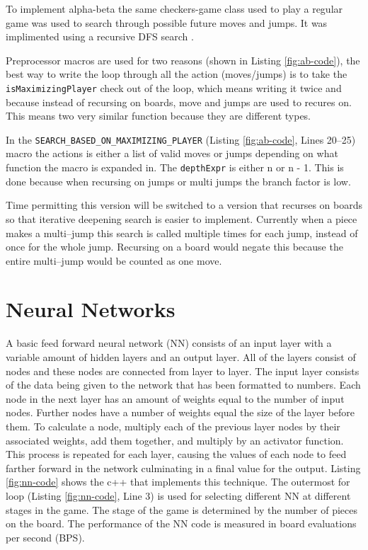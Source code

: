 \documentclass{article}
\begin{document}
To implement alpha-beta the same checkers-game class used to play a regular
game was used to search through possible future moves and jumps. It was implimented
using a recursive DFS search .


Preprocessor macros are used for two reasons (shown in Listing \ref{fig:ab-code}), the best way to write the loop
through all the action (moves/jumps) is to take the \texttt{isMaximizingPlayer} check
out of the loop, which means writing it twice and because instead of recursing
on boards, move and jumps are used to recures on. This means two very similar
function because they are different types.

In the \texttt{SEARCH\_BASED\_ON\_MAXIMIZING\_PLAYER} (Listing \ref{fig:ab-code}, Lines 20--25)
macro the actions is either a list of valid
moves or jumps depending on what function the macro is expanded in. The
\texttt{depthExpr} is either n or n - 1. This is done because when recursing on
jumps or multi jumps the branch factor is low.

Time permitting this version
will be switched to a version that recurses on boards so that iterative
deepening search is easier to implement. Currently when a piece makes a
multi--jump this search is called multiple times for each jump, instead of once
for the whole jump. Recursing on a board would negate this because the entire
multi--jump would be counted as one move.

\section{Neural Networks}

A basic feed forward neural network (NN) consists of an input layer
with a variable amount of hidden layers and an output layer. All of the layers
consist of nodes and these nodes are connected from layer to layer. The input
layer consists of the data being given to the network that has been formatted
to numbers. Each node in the next layer has an amount of weights equal to the
number of input nodes. Further nodes have a number of weights equal the size of
the layer before them. To calculate a node, multiply each of the previous layer
nodes by their associated weights, add them together, and multiply by an
activator function. This process is repeated for each layer, causing the values
of each node to feed farther forward in the network culminating in a final
value for the output. Listing \ref{fig:nn-code} shows the c++ that implements this technique.
The outermost for loop (Listing \ref{fig:nn-code}, Line 3) is used for selecting
different NN at different stages in the game. The stage of the game is determined
by the number of pieces on the board.
The performance of the NN code is measured in board evaluations per
second (BPS).
\end{document}

